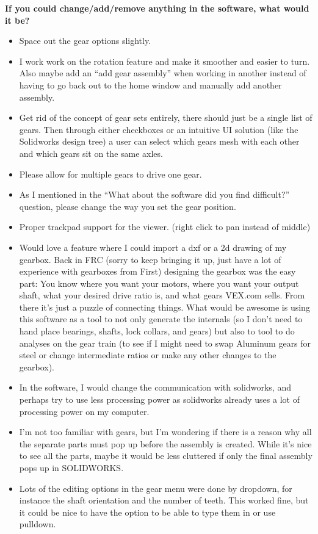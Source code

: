 \noindent\textbf{If you could change/add/remove anything in the software, what would it be?}
\begin{itemize}
    \item Space out the gear options slightly.
\item I work work on the rotation feature and make it smoother and easier to turn. Also maybe add an ``add gear assembly'' when working in another instead of having to go back out to the home window and manually add another assembly.
\item Get rid of the concept of gear sets entirely, there should just be a single list of gears. Then through either checkboxes or an intuitive UI solution (like the Solidworks design tree) a user can select which gears mesh with each other and which gears sit on the same axles.
\item Please allow for multiple gears to drive one gear.
\item As I mentioned in the ``What about the software did you find difficult?'' question, please change the way you set the gear position.
\item Proper trackpad support for the viewer. (right click to pan instead of middle)
\item Would love a feature where I could import a dxf or a 2d drawing of my gearbox. Back in FRC (sorry to keep bringing it up, just have a lot of experience with gearboxes from First) designing the gearbox was the easy part: You know where you want your motors, where you want your output shaft, what your desired drive ratio is, and what gears VEX.com sells. From there it's just a puzzle of connecting things. What would be awesome is using this software as a tool to not only generate the internals (so I don't need to hand place bearings, shafts, lock collars, and gears) but also to tool to do analyses on the gear train (to see if I might need to swap Aluminum gears for steel or change intermediate ratios or make any other changes to the gearbox).
\item In the software, I would change the communication with solidworks, and perhaps try to use less processing power as solidworks already uses a lot of processing power on my computer.
\item I'm not too familiar with gears, but I'm wondering if there is a reason why all the separate parts must pop up before the assembly is created. While it's nice to see all the parts, maybe it would be less cluttered if only the final assembly pops up in SOLIDWORKS. 
\item Lots of the editing options in the gear menu were done by dropdown, for instance the shaft orientation and the number of teeth. This worked fine, but it could be nice to have the option to be able to type them in or use pulldown.

\end{itemize}
